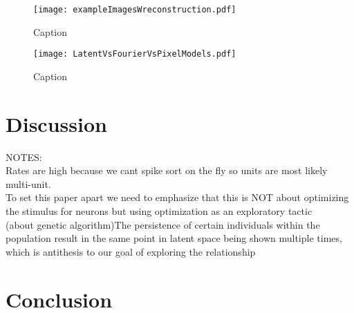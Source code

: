 \begin{figure}
	\centering
	\texttt{[image: exampleImagesWreconstruction.pdf]}
	\caption{Caption}
	\label{fig:exampleReconstructions}
\end{figure}

\begin{figure}
	\centering
	\texttt{[image: LatentVsFourierVsPixelModels.pdf]}
	\caption{Caption}
	\label{fig:modelAICs}
\end{figure}


\section{Discussion}


NOTES: \\
Rates are high because we cant spike sort on the fly so units are most likely multi-unit.\\
To set this paper apart we need to emphasize that this is NOT about optimizing the stimulus for neurons but using optimization as an exploratory tactic \\
(about genetic algorithm)The persistence of certain individuals within the population result in the same point in latent space being shown multiple times, which is antithesis to our goal of exploring the relationship\\

\section{Conclusion}






 